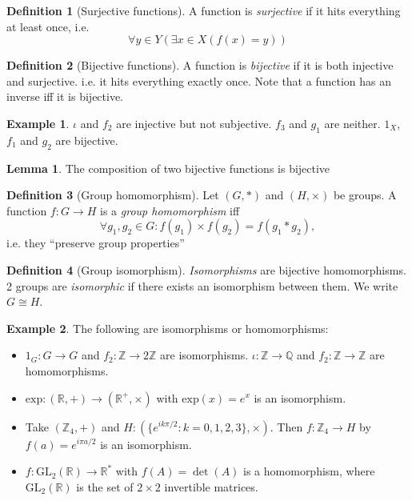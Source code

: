 \documentclass[a4paper]{article}
\theoremstyle{definition}
\newtheorem*{defi}{Definition}
\newtheorem*{eg}{Example}
\newtheorem*{lemma}{Lemma}
\newcommand{\Z}{\mathbb{Z}}
\newcommand{\Q}{\mathbb{Q}}
\newcommand{\R}{\mathbb{R}}
\newcommand{\GL}{\mathrm{GL}}
\begin{document}
\begin{defi}[Surjective functions]
  A function is \emph{surjective} if it hits everything at least once, i.e. 
  \[
  \forall y\in Y(\exists x\in X(f(x) = y))
  \]
\end{defi}

\begin{defi}[Bijective functions]
  A function is \emph{bijective} if it is both injective and surjective. i.e. it hits everything exactly once. Note that a function has an inverse iff it is bijective.
\end{defi}

\begin{eg}
  $\iota$ and $f_2$ are injective but not subjective. $f_3$ and $g_1$ are neither. $1_X$, $f_1$ and $g_2$ are bijective.
\end{eg}

\begin{lemma}
  The composition of two bijective functions is bijective
\end{lemma}

\begin{defi}[Group homomorphism]
  Let $(G, *)$ and $(H, \times)$ be groups. A function $f:G\rightarrow H$ is a \emph{group homomorphism} iff
  \[
  \forall g_1, g_2 \in G: f(g_1)\times f(g_2) = f(g_1 * g_2),
  \]
  i.e. they ``preserve group properties''
\end{defi}

\begin{defi}[Group isomorphism]
  \emph{Isomorphisms} are bijective homomorphisms. 2 groups are \emph{isomorphic} if there exists an isomorphism between them. We write $G\cong H$.
\end{defi}

\begin{eg}
  The following are isomorphisms or homomorphisms:
  \begin{itemize}
  \item $1_G: G \rightarrow G$ and $f_2: \Z \rightarrow 2\Z$  are isomorphisms. $\iota: \Z\rightarrow\Q$ and $f_2:\Z\rightarrow\Z$ are homomorphisms.
  \item $\mathrm{exp}: (\R, +) \rightarrow (\R^+, \times)$ with $\mathrm{exp}(x) = e^x$ is an isomorphism.
  \item Take $(\Z_4, +)$ and $H: (\{e^{ik\pi/2}:k=0, 1 ,2, 3\}, \times)$. Then $f: \Z_4 \rightarrow H$  by $f(a) = e^{i\pi a/2}$ is an isomorphism.
  \item $f: \GL_2(\R) \rightarrow \R^*$ with $f(A) = \det(A)$ is a homomorphism, where $\GL_2(\R)$ is the set of $2\times 2$ invertible matrices.
  \end{itemize}
\end{eg}
\end{document}
